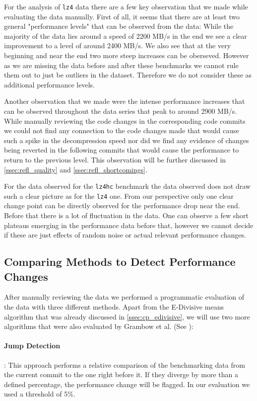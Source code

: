 \documentclass[	runningheads,
				a4paper]{llncs}
\begin{document}
For the analysis of \texttt{lz4} data there are a few key observation that we made while evaluating the data manually. First of all, it seems that there are at least two general "performance levels" that can be observed from the data: While the majority of the data lies around a speed of 2200 MB/s in the end we see a clear improvement to a level of around 2400 MB/s. We also see that at the very beginning and near the end two more steep increases can be oberseved. However as we are missing the data before and after these benchmarks we cannot rule them out to just be outliers in the dataset. Therefore we do not consider these as additional performance levels.

Another observation that we made were the intense performance increases that can be observed throughout the data series that peak to around 2900 MB/s. While manually reviewing the code changes in the corresponding code commits we could not find any connection to the code changes made that would cause such a spike in the decompression speed nor did we find any evidence of changes being reverted in the following commits that would cause the performance to return to the previous level. This observation will be further discussed in \autoref{ssec:refl_quality} and \autoref{ssec:refl_shortcomings}.

For the data observed for the \texttt{lz4hc} benchmark the data observed does not draw such a clear picture as for the \texttt{lz4} one. From our perspective only one clear change point can be directly observed for the performance drop near the end. Before that there is a lot of fluctuation in the data. One can observe a few short plateaus emerging in the performance data before that, however we cannot decide if these are just effects of random noise or actual relevant performance changes.

\subsection{Comparing Methods to Detect Performance Changes}
After manually reviewing the data we performed a programmatic evaluation of the data with three different methods. Apart from the E-Divisive means algorithm that was already discussed in \autoref{ssec:cp_edivisive}, we will use two more algorithms that were also evaluated by Grambow et al. (See \cite{grambow2019}):

\paragraph{Jump Detection}: This approach performs a relative comparison of the benchmarking data from the current commit to the one right before it. If they diverge by more than a defined percentage, the performance change will be flagged. In our evaluation we used a threshold of 5\%.
\end{document}
